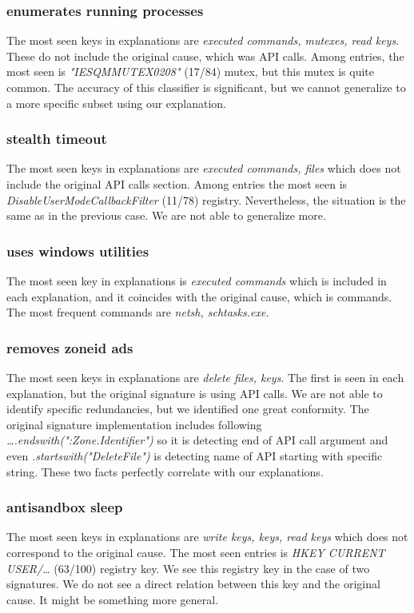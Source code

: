 \subsubsection*{enumerates running processes}
The most seen keys in explanations are \emph{executed commands, mutexes, read keys}. These do not include the original cause, which was API calls.  Among entries, the most seen is \emph{"IESQMMUTEX0208"} (17/84) mutex, but this mutex is quite common. The accuracy of this classifier is significant, but we cannot generalize to a more specific subset using our explanation.

\subsubsection*{stealth timeout}
The most seen keys in explanations are \emph{executed commands, files} which does not include the original API calls section. Among entries the most seen is \emph{DisableUserModeCallbackFilter} (11/78) registry. Nevertheless, the situation is the same as in the previous case. We are not able to generalize more.

\subsubsection*{uses windows utilities}
The most seen key in explanations is \emph{executed commands} which is included in each explanation, and it coincides with the original cause, which is commands. The most frequent commands are \emph{netsh, schtasks.exe}.

\subsubsection*{removes zoneid ads}
The most seen keys in explanations are \emph{delete files, keys}. The first is seen in each explanation, but the original signature is using API calls. We are not able to identify specific redundancies, but we identified one great conformity. The original signature implementation includes following \emph{\dots .endswith(":Zone.Identifier")} so it is detecting end of API call argument and even \emph{.startswith("DeleteFile")} is detecting name of API starting with specific string. These two facts perfectly correlate with our explanations.

\subsubsection*{antisandbox sleep}
The most seen keys in explanations are \emph{write keys, keys, read keys} which does not correspond to the original cause. The most seen entries is \emph{HKEY CURRENT USER/\dots} (63/100) registry key. We see this registry key in the case of two signatures. We do not see a direct relation between this key and the original cause. It might be something more general.

